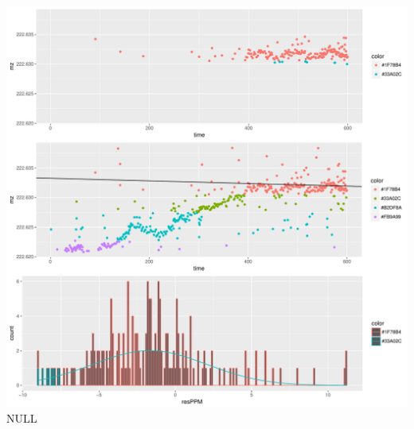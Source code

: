 \documentclass[]{article}
\begin{document}
\includegraphics{Supplementary_document_files/figure-latex/filter.lm.222-1.pdf}
NULL
\end{document}
